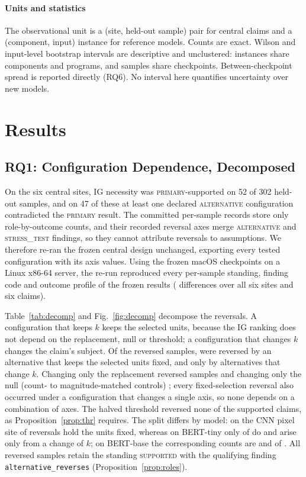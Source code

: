 \paragraph*{Units and statistics}
The observational unit is a (site, held-out sample) pair for central claims and a (component, input) instance for reference models. Counts are exact. Wilson and input-level bootstrap intervals are descriptive and unclustered: instances share components and programs, and samples share checkpoints. Between-checkpoint spread is reported directly (RQ6). No interval here quantifies uncertainty over new models.

\section{Results}
\label{sec:results}

\subsection{RQ1: Configuration Dependence, Decomposed}
\label{sec:res-config}

On the six central sites, IG necessity was \textsc{primary}-supported on 52 of 302 held-out samples, and on 47 of these at least one declared \textsc{alternative} configuration contradicted the \textsc{primary} result. The committed per-sample records store only role-by-outcome counts, and their recorded reversal axes merge \textsc{alternative} and \textsc{stress\_test} findings, so they cannot attribute reversals to assumptions. We therefore re-ran the frozen central design unchanged, exporting every tested configuration with its axis values. Using the frozen macOS checkpoints on a Linux x86-64 server, the re-run reproduced every per-sample standing, finding code and outcome profile of the frozen results (\ReproDiffs{} differences over all six sites and six claims).

Table~\ref{tab:decomp} and Fig.~\ref{fig:decomp} decompose the reversals. A configuration that keeps $k$ keeps the selected units, because the IG ranking does not depend on the replacement, null or threshold; a configuration that changes $k$ changes the claim's subject. Of the \TotRev{} reversed samples, \TotFixed{} were reversed by an alternative that keeps the selected units fixed, and \TotKOnly{} only by alternatives that change $k$. Changing only the replacement reversed \TotRepl{} samples and changing only the null (count- to magnitude-matched controls) \TotNull{}; every fixed-selection reversal also occurred under a configuration that changes a single axis, so none depends on a combination of axes. The halved threshold reversed none of the supported claims, as Proposition~\ref{prop:thr} requires. The split differs by model: on the CNN pixel site \CnnFixed{} of \CnnRev{} reversals hold the units fixed, whereas on BERT-tiny only \TinyFixed{} of \TinyRev{} do and \TinyKOnly{} arise only from a change of $k$; on BERT-base the corresponding counts are \BaseFixed{} and \BaseKOnly{} of \BaseRev{}. All reversed samples retain the standing \textsc{supported} with the qualifying finding \texttt{alternative\_reverses} (Proposition~\ref{prop:roles}).

